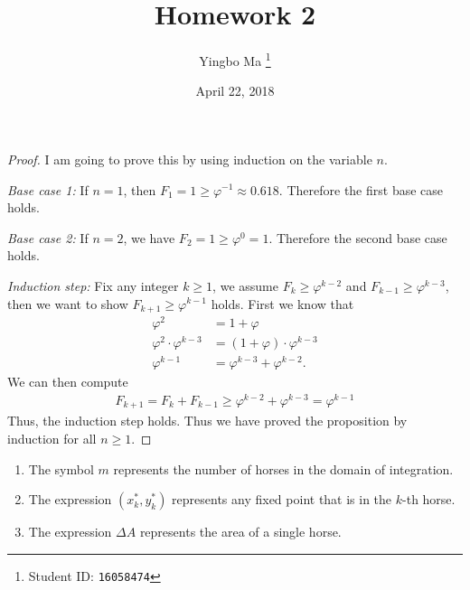 \documentclass[8pt,twocolumn]{article}
\author{Yingbo Ma \thanks{Student ID: \tt{16058474}}}
\title{\vspace{-1.cm}Homework 2}
\date{April 22, 2018}
\begin{document}
\maketitle

\begin{Answer}[number=17]
\begin{proof}
  I am going to prove this by using induction on the variable $n$.

  \emph{Base case 1:} If $n=1$, then $F_1 = 1 \ge \varphi^{-1} \approx 0.618$.
  Therefore the first base case holds.

  \emph{Base case 2:} If $n=2$, we have $F_2 = 1 \ge \varphi^{0} = 1$.
  Therefore the second base case holds.

  \emph{Induction step:} Fix any integer $k\ge 1$, we assume $F_k\ge
  \varphi^{k-2}$ and $F_{k-1}\ge\varphi^{k-3}$, then we want to show $F_{k+1}
  \ge \varphi^{k-1}$ holds. First
  we know that
  \begin{align*}
    \varphi^2 &= 1+\varphi \\
    \varphi^2\cdot\varphi^{k-3} &= (1+\varphi)\cdot\varphi^{k-3} \\
    \varphi^{k-1} &= \varphi^{k-3} + \varphi^{k-2}.
  \end{align*}
  We can then compute
  \begin{align*}
    F_{k+1} = F_k + F_{k-1} \ge \varphi^{k-2} + \varphi^{k-3} = \varphi^{k-1}
  \end{align*}
  Thus, the induction step holds. Thus we have proved the proposition by
  induction for all $n\ge 1$.
\end{proof}
\end{Answer}

\begin{Answer}[number=18]
  \begin{enumerate}
    \item The symbol $m$ represents the number of horses in the domain of
      integration.
    \item The expression $(x_k^*,y_k^*)$ represents any fixed point that is in
      the $k$-th horse.
    \item The expression $\Delta A$ represents the area of a single horse.
  \end{enumerate}
\end{Answer}
\end{document}
